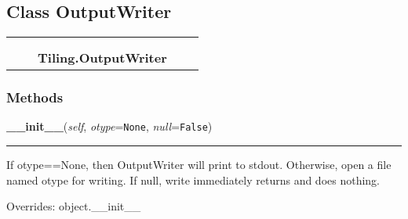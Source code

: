 
\subsection{Class OutputWriter}

    \label{Tiling:OutputWriter}
\begin{tabular}{cccccc}
\multicolumn{2}{r}{\settowidth{\BCL}{object}\multirow{2}{\BCL}{object}}
&&
  \\\cline{3-3}
  &&\multicolumn{1}{c|}{}
&&
  \\
&&\multicolumn{2}{l}{\textbf{Tiling.OutputWriter}}
\end{tabular}



  \subsubsection{Methods}

    \vspace{0.5ex}

\hspace{.8\funcindent}\begin{boxedminipage}{\funcwidth}

    \raggedright \textbf{\_\_init\_\_}(\textit{self}, \textit{otype}={\tt None}, \textit{null}={\tt False})

    \vspace{-1.5ex}

    \rule{\textwidth}{0.5\fboxrule}
\setlength{\parskip}{2ex}
    If otype==None, then OutputWriter will print to stdout. Otherwise, open
    a file named otype for writing. If null, write immediately returns and 
    does nothing.

\setlength{\parskip}{1ex}
      Overrides: object.\_\_init\_\_

    \end{boxedminipage}

    \label{Tiling:OutputWriter:close}

